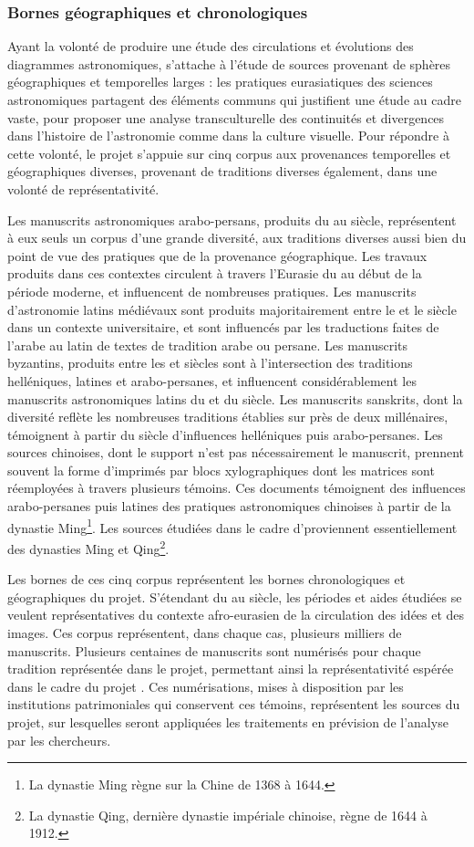 	\subsubsection{Bornes géographiques et chronologiques}
	Ayant la volonté de produire une étude des circulations et évolutions des diagrammes astronomiques, \eida s'attache à l'étude de sources provenant de sphères géographiques et temporelles larges : les pratiques eurasiatiques des sciences astronomiques partagent des éléments communs qui justifient une étude au cadre vaste, pour proposer une analyse transculturelle des continuités et divergences dans l'histoire de l'astronomie comme dans la culture visuelle. Pour répondre à cette volonté, le projet \eida s'appuie sur cinq corpus aux provenances temporelles et géographiques diverses, provenant de traditions diverses également, dans une volonté de représentativité. 
	
	Les manuscrits astronomiques arabo-persans, produits du \viii au \xviii siècle, représentent à eux seuls un corpus d'une grande diversité, aux traditions diverses aussi bien du point de vue des pratiques que de la provenance géographique. Les travaux produits dans ces contextes circulent à travers l'Eurasie du \ma au début de la période moderne, et influencent de nombreuses pratiques. Les manuscrits d'astronomie latins médiévaux sont produits majoritairement entre le \xiii et le \xvi siècle dans un contexte universitaire, et sont influencés par les traductions faites de l'arabe au latin de textes de tradition arabe ou persane. Les manuscrits byzantins, produits entre les \ix et \xv siècles sont à l'intersection des traditions helléniques, latines et arabo-persanes, et influencent considérablement les manuscrits astronomiques latins du \xv et du \xvi siècle. Les manuscrits sanskrits, dont la diversité reflète les nombreuses traditions établies sur près de deux millénaires, témoignent à partir du \xie siècle d'influences helléniques puis arabo-persanes. Les sources chinoises, dont le support n'est pas nécessairement le manuscrit, prennent souvent la forme d'imprimés par blocs xylographiques dont les matrices sont réemployées à travers plusieurs témoins. Ces documents témoignent des influences arabo-persanes puis latines des pratiques astronomiques chinoises à partir de la dynastie Ming\footnote{La dynastie Ming règne sur la Chine de 1368 à 1644.}. Les sources étudiées dans le cadre d'\eida proviennent essentiellement des dynasties Ming et Qing\footnote{La dynastie Qing, dernière dynastie impériale chinoise, règne de 1644 à 1912.}.
	
	Les bornes de ces cinq corpus représentent les bornes chronologiques et géographiques du projet. S'étendant du \viii au \xviii siècle, les périodes et aides étudiées se veulent représentatives du contexte afro-eurasien de la circulation des idées et des images. Ces corpus représentent, dans chaque cas, plusieurs milliers de manuscrits. Plusieurs centaines de manuscrits sont numérisés pour chaque tradition représentée dans le projet, permettant ainsi la représentativité espérée dans le cadre du projet \eida. Ces numérisations, mises à disposition par les institutions patrimoniales qui conservent ces témoins, représentent les sources du projet, sur lesquelles seront appliquées les traitements en prévision de l'analyse par les chercheurs.
